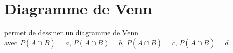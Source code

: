\section{Diagramme de Venn}
 permet de dessiner un diagramme de Venn  \\
avec $P(A \cap \overline B)=a$, $P(A \cap  B)=b$, $P(\overline A \cap  B)=c$, $P(\overline A \cap \overline B)=d$ 




